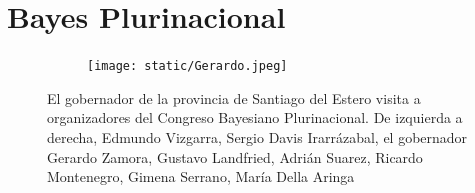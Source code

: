 \documentclass[a4paper,11pt]{book}
\theoremstyle{definition}
\begin{document}
\newpage
\section{Bayes Plurinacional}


\begin{figure}[!ht]
\centering
  \begin{subfigure}[b]{0.8\textwidth}
  \texttt{[image: static/Gerardo.jpeg]}
  \end{subfigure}
  \caption{El gobernador de la provincia de Santiago del Estero visita a organizadores del Congreso Bayesiano Plurinacional. De izquierda a derecha, Edmundo Vizgarra, Sergio Davis Irarr\'azabal, el gobernador Gerardo Zamora, Gustavo Landfried, Adri\'an Suarez, Ricardo Montenegro, Gimena Serrano, Mar\'ia Della Aringa}
  \label{fig:gerardo}
\end{figure}
\end{document}

